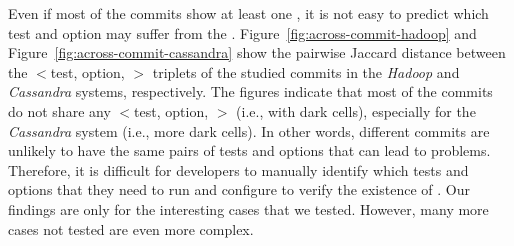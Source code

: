 Even if most of the commits show at least one \inconsistent, it is not easy to predict which test and option may suffer from the \inconsistent. 
Figure~\ref{fig:across-commit-hadoop} and Figure~\ref{fig:across-commit-cassandra} show the pairwise Jaccard distance between the $<$test, option, \inconsistent$>$ triplets of the studied commits in the \emph{Hadoop} and \emph{Cassandra} systems, respectively. %
The figures indicate that most of the commits do not share any $<$test, option, \inconsistent$>$ (i.e., with dark cells), especially for the \emph{Cassandra} system (i.e., more dark cells).
In other words, different commits are unlikely to have the same pairs of tests and options that can lead to \inconsistent problems. %
Therefore, it is difficult for developers to manually identify which tests and options that they need to run and configure to verify the existence of \inconsistent. Our findings are only for the interesting cases that we tested. However, many more cases not tested are even more complex. %

